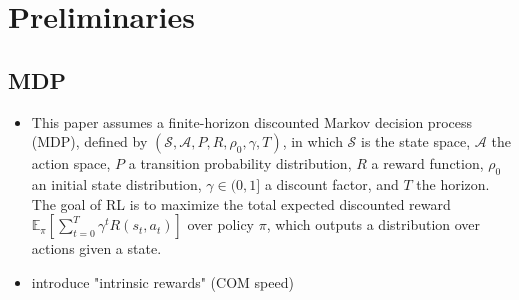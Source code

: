 \documentclass{article} %
\renewcommand{\S}{\mathcal{S}}
\newcommand{\A}{\mathcal{A}}
\newcommand{\EE}{\mathbb{E}}
\begin{document}








\section{Preliminaries}
\subsection{MDP}
\begin{itemize}
    \item This paper assumes a finite-horizon discounted Markov decision process (MDP), defined by $(\S,\A,P, R, \rho_0, \gamma, T)$, in which $\S$ is the state space, $\A$ the action space, $P$ a transition probability distribution, $R$ a reward function, $\rho_0$ an initial state distribution,  $\gamma \in (0, 1]$ a discount factor, and $T$ the horizon. The goal of RL is to maximize the total expected discounted reward $\EE_{\pi} \left[\sum_{t=0}^T \gamma^t R(s_t, a_t) \right]$ over policy $\pi$, which outputs a distribution over actions given a state.
    \item introduce "intrinsic rewards" (COM speed)
\end{itemize}
\end{document}
